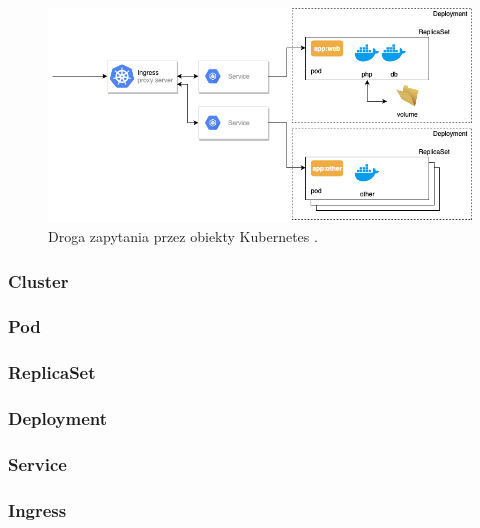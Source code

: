 \begin{figure}[!ht]
	\begin{center}
		\includegraphics[width=1\textwidth]{img/k8s-objects}
	\end{center}
	\caption{Droga zapytania przez obiekty Kubernetes \cite{k8s-diagram}.}
\end{figure}

\subsubsection{Cluster}


\subsubsection{Pod}


\subsubsection{ReplicaSet}


\subsubsection{Deployment}


\subsubsection{Service}


\subsubsection{Ingress}
